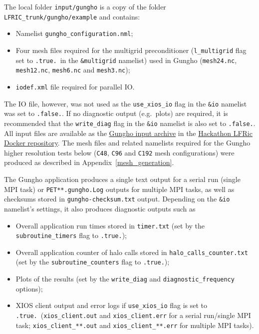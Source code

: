 \documentclass[twoside,a4paper,12pt]{article}
\begin{document}
The local folder \texttt{input/gungho} is a copy of the folder
\texttt{LFRIC\_trunk/gungho/example} and contains:

\begin{itemize}

\item Namelist \texttt{gungho\_configuration.nml};

\item Four mesh files required for the multigrid preconditioner
(\texttt{l\_multigrid} flag set to \texttt{.true.}\ in the \texttt{\&multigrid}
namelist) used in Gungho (\texttt{mesh24.nc}, \texttt{mesh12.nc},
\texttt{mesh6.nc} and \texttt{mesh3.nc});

\item \texttt{iodef.xml} file required for parallel IO.

\end{itemize}

The IO file, however, was not used as the \texttt{use\_xios\_io} flag in the
\texttt{\&io} namelist was set to \texttt{.false.}. If no diagnostic output
(e.g.\ plots) are required, it is recommended that the \texttt{write\_diag} flag
in the \texttt{\&io} namelist is also set to \texttt{.false.}. All input
files are available as the
\href{https://github.com/eth-cscs/ContainerHackathon/blob/master/LFRIC/docker/input-gungho.tar.gz}
{Gungho input archive} in the
\href{https://github.com/eth-cscs/ContainerHackathon/tree/master/LFRIC/docker}
{Hackathon LFRic Docker repository}. The mesh files and related namelists
required for the Gungho higher resolution tests below (\texttt{C48},
\texttt{C96} and \texttt{C192} mesh configurations) were produced as described
in Appendix~\ref{mesh_generation}.

The Gungho application produces a single text output for a serial run (single
MPI task) or \texttt{PET**.gungho.Log} outputs for multiple MPI tasks, as well
as checksums stored in \texttt{gungho-checksum.txt} output. Depending on the
\texttt{\&io} namelist's settings, it also produces diagnostic outputs such as

\begin{itemize}

\item Overall application run times stored in \texttt{timer.txt} (set by the
\texttt{subroutine\_timers} flag to \texttt{.true.});

\item Overall application counter of halo calls stored in
\texttt{halo\_calls\_counter.txt} (set by the \texttt{subroutine\_counters} flag
to \texttt{.true.});

\item Plots of the results (set by the \texttt{write\_diag} and
\texttt{diagnostic\_frequency} options);

\item XIOS client output and error logs if \texttt{use\_xios\_io} flag is set to
\texttt{.true.}\ (\texttt{xios\_client.out} and \texttt{xios\_client.err} for a
serial run/single MPI task; \texttt{xios\_client\_**.out} and
\texttt{xios\_client\_**.err} for multiple MPI tasks).

\end{itemize}
%
%
\end{document}
